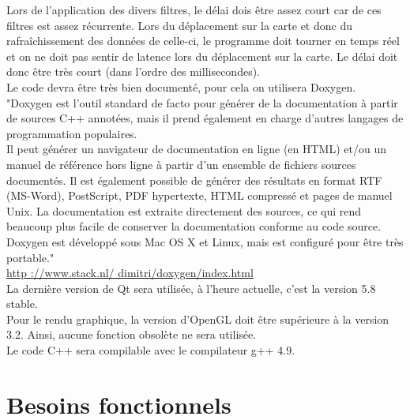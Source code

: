 \documentclass[12pt]{article}
\begin{document}
		Lors de l’application des divers filtres, le délai dois être assez court car 
		de ces filtres est assez récurrente.
		Lors du déplacement sur la carte et donc du rafraîchissement des données de celle-ci,
		le programme doit tourner en temps réel et on ne doit pas sentir de latence lors du
		déplacement sur la carte. Le délai doit donc être très court (dans l’ordre des millisecondes).\\
		Le code devra être très bien documenté, pour cela on utilisera Doxygen.
		"Doxygen est l’outil standard de facto pour générer de la documentation à partir de
		sources C++ annotées, mais il prend également en charge d’autres langages de
		programmation populaires.\\
		Il peut générer un navigateur de documentation en ligne (en HTML) et/ou un manuel de
		référence hors ligne à partir d’un ensemble de fichiers sources documentés. Il est
		également possible de générer des résultats en format RTF (MS-Word), PostScript,
		PDF hypertexte, HTML compressé et pages de manuel Unix. La documentation est 
		extraite directement des sources, ce qui rend beaucoup plus facile de conserver
		la documentation conforme au code source. \\
		Doxygen est développé sous Mac OS X et Linux, mais est configuré pour être très
		portable."\\
		
		\url{http ://www.stack.nl/ dimitri/doxygen/index.html} \\
		
		La dernière version de Qt sera utilisée, à l’heure actuelle, c’est la version
		5.8 stable.\\
		Pour le rendu graphique, la version d’OpenGL doit être supérieure à la version 3.2.
		Ainsi, aucune fonction obsolète ne sera utilisée.\\
		Le code C++ sera compilable avec le compilateur g++ 4.9.
		

	\section{Besoins fonctionnels}
\end{document}
